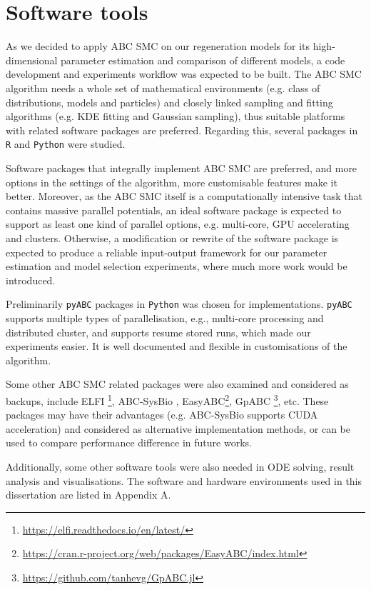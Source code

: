 \section{Software tools}



As we decided to apply ABC SMC on our regeneration models for its high-dimensional parameter estimation and comparison of different models, a code development and experiments workflow was expected to be built. The ABC SMC algorithm needs a whole set of mathematical environments (e.g. class of distributions, models and particles) and closely linked sampling and fitting algorithms (e.g. KDE fitting and Gaussian sampling), thus suitable platforms with related software packages are preferred. Regarding this, several packages in \verb|R| and \verb|Python| were studied.

Software packages that integrally implement ABC SMC are preferred, and more options in the settings of the algorithm, more customisable features make it better. Moreover, as the ABC SMC itself is a computationally intensive task that contains massive parallel potentials, an ideal software package is expected to support as least one kind of parallel options, e.g. multi-core, GPU accelerating and clusters. Otherwise, a modification or rewrite of the software package is expected to produce a reliable input-output framework for our parameter estimation and model selection experiments, where much more work would be introduced.

Preliminarily \verb|pyABC| packages \cite{ref:pyabc} in \verb|Python| was chosen for implementations. \verb|pyABC| supports multiple types of parallelisation, e.g., multi-core processing and distributed cluster, and supports resume stored runs, which made our experiments easier. It is well documented and flexible in customisations of the algorithm.

Some other ABC SMC related packages were also examined and considered as backups, include ELFI \footnote{\url{https://elfi.readthedocs.io/en/latest/}}, ABC-SysBio \cite{ref:abcsysbio}, EasyABC\footnote{\url{https://cran.r-project.org/web/packages/EasyABC/index.html}}, GpABC \footnote{\url{https://github.com/tanhevg/GpABC.jl}}, etc. These packages may have their advantages (e.g. ABC-SysBio supports CUDA acceleration) and considered as alternative implementation methods, or can be used to compare performance difference in future works.

Additionally, some other software tools were also needed in ODE solving, result analysis and visualisations. The software and hardware environments used in this dissertation are listed in Appendix A.
